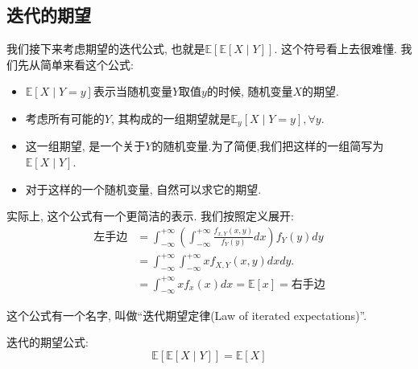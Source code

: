     \subsection{迭代的期望}

    我们接下来考虑期望的迭代公式, 也就是$\mathbb{E}[\mathbb{E}[X \mid Y]]$. 这个符号看上去很难懂. 我们先从简单来看这个公式: 
    \begin{itemize}
        \item $\mathbb{E}[X \mid Y=y]$表示当随机变量$Y$取值$y$的时候, 随机变量$X$的期望. 
        \item 考虑所有可能的$Y$, 其构成的一组期望就是$\mathbb{E}_y[X \mid Y=y], \forall y$. 
        \item 这一组期望, 是一个关于$Y$的随机变量.为了简便,我们把这样的一组简写为$\mathbb{E}[X \mid Y]$.
        \item 对于这样的一个随机变量, 自然可以求它的期望. 
    \end{itemize}

    实际上, 这个公式有一个更简洁的表示. 我们按照定义展开: 
    $$\begin{aligned} \text{左手边} & =\int_{-\infty}^{+\infty}\left(\int_{-\infty}^{+\infty} \frac{f_{x, Y}(x, y)}{f_Y(y)} d x\right) f_Y(y) d y \\ & =\int_{-\infty}^{+\infty} \int_{-\infty}^{+\infty} x f_{X, Y}(x, y) d x d y . \\ & =\int_{-\infty}^{+\infty} x f_x(x) d x=\mathbb{E}[x]=\text{右手边}\end{aligned}$$

    这个公式有一个名字, 叫做``迭代期望定律(Law of iterated expectations)''. 

    \begin{theorem}
        迭代的期望公式:$$
\mathbb{E}[{\mathbb{E}}[X \mid Y]]=\mathbb{E}[X]
$$
    \end{theorem}

